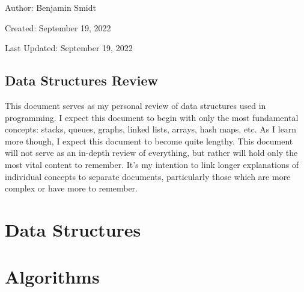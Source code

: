 \documentclass[12pt]{article}
\begin{document}
\noindent Author: Benjamin Smidt

\noindent Created: September 19, 2022

\noindent Last Updated: September 19, 2022
\begin{center}
\section*{Data Structures Review}
\end{center}

\noindent This document serves as my personal review of data structures used in programming. 
I expect this document to begin with only the most fundamental concepts: stacks, queues, graphs, 
linked lists, arrays, hash maps, etc. As I learn more though, I expect this document to become quite lengthy. This 
document will not serve as an in-depth review of everything, but rather will hold only the most vital content
to remember. It's my intention to link longer explanations of individual concepts to separate documents, 
particularly those which are more complex or have more to remember. 

\section{Data Structures}

\section{Algorithms}
\end{document}
